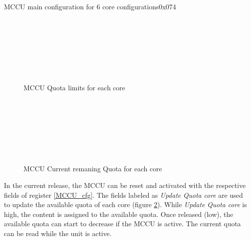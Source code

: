 \begin{register}{}{MCCU main configuration for 6 core configurations}{0x074}
	\label{MCCU_cfg_6c}
	\regnewline
\end{register}
\begin{figure}[H]
	\begin{center}
		 \\
		 \\
		 \\
		 \\
		 \\
		 \\
	\end{center}
	\caption{MCCU Quota limits for each core}\label{fig:MCCU_lim}
\end{figure}
\begin{figure}[H]
	\begin{center}
		 \\
		 \\
		 \\
		 \\
		 \\
		 \\
	\end{center}
	\caption{MCCU Current remaning Quota for each core}\label{fig:MCCU_ava}
\end{figure}
In the current release, the MCCU can be reset and activated with the respective fields of register \ref{MCCU_cfg}. The fields labeled as \textit{Update Quota core} are used to update the available quota of each core (figure \ref{fig:MCCU_ava}). While  \textit{Update Quota core} is high, the content is assigned to the available quota. Once released (low), the available quota can start to decrease if the MCCU is active. The current quota can be read while the unit is active.\\
